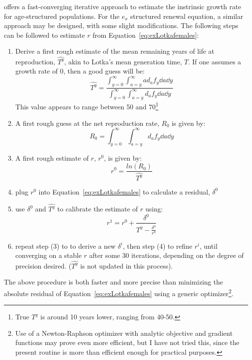 \citet{coale1957new} offers a fast-converging iterative approach to estimate the
instrinsic growth rate for age-structured populations. For the $e_x$ structured
renewal equation, a similar approach may be designed, with some slight
modifications. The following steps can be followed to estimate $r$ from
Equation~\ref{eq:exLotkafemales}:

\begin{enumerate}
  \item Derive a first rough estimate of the mean remaining years of life at
  reproduction, $\widehat{T^y}$, akin to Lotka's mean generation time, $T$. If
  one assumes a growth rate of $0$, then a good guess will be:
\begin{equation}
\widehat{T^y} = \frac{\int _{y=0}^\infty \int _{a=y}^\infty a d_a f_y \dd a
\dd y}{\int _{y=0}^\infty \int _{a=y}^\infty d_a f_y \dd a \dd y}
\end{equation}
 This value appears to range between 50 and 70\footnote{True $T^y$ is around 10
 years lower, ranging from 40-50.}
  \item A first rough guess at the net reproduction rate, $R_0$ is given by:
 \begin{equation}
  R_0 = \int _{y=0}^\infty \int _{a=y}^\infty d_a f_y \dd a
\dd y
\end{equation}
  \item A first rough estimate of $r$, $r^0$, is given by:
   \begin{equation}
   r^0 = \frac{ln(R_0)}{\widehat{T^y}}
   \end{equation}
  \item plug $r^0$ into Equation~\ref{eq:exLotkafemales} to calculate a
  residual, $\delta^0$
  \item use $\delta^0$ and $\widehat{T^y}$ to calibrate the estimate of $r$
  using:
  \begin{equation}
  r^{1} = r^0 + \frac{\delta^0}{\widehat{T^y} - \frac{\delta^0}{r^0}}
  \end{equation}
  \item repeat step (3) to to derive a new $\delta^i$, then step (4) to refine
  $r^i$, until converging on a stable $r$ after some 30 iterations,
  depending on the degree of precision desired. ($\widehat{T^y}$ is not updated
  in this process).
\end{enumerate}

The above procedure is both faster and more precise than minimizing the absolute
residual of Equation~\ref{eq:exLotkafemales} using a generic
optimizer\footnote{Use of a Newton-Raphson optimizer with analytic objective
and gradient functions may prove even more efficient, but I have not tried
this, since the present routine is more than efficient enough for practical
purposes.}. 

